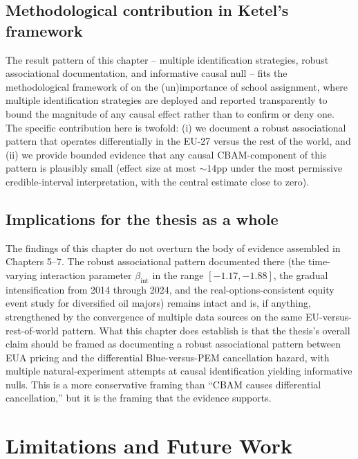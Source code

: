 \documentclass[11pt,a4paper]{article}
\newcommand{\bint}{\beta_{\mathrm{int}}}
\begin{document}
\subsection{Methodological contribution in Ketel's framework}

The result pattern of this chapter -- multiple identification strategies, robust associational documentation, and informative causal null -- fits the methodological framework of \citet{ketel2023unimportance} on the (un)importance of school assignment, where multiple identification strategies are deployed and reported transparently to bound the magnitude of any causal effect rather than to confirm or deny one. The specific contribution here is twofold: (i) we document a robust associational pattern that operates differentially in the EU-27 versus the rest of the world, and (ii) we provide bounded evidence that any causal CBAM-component of this pattern is plausibly small (effect size at most $\sim 14$pp under the most permissive credible-interval interpretation, with the central estimate close to zero).

\subsection{Implications for the thesis as a whole}

The findings of this chapter do not overturn the body of evidence assembled in Chapters 5--7. The robust associational pattern documented there (the time-varying interaction parameter $\bint$ in the range $[-1.17, -1.88]$, the gradual intensification from 2014 through 2024, and the real-options-consistent equity event study for diversified oil majors) remains intact and is, if anything, strengthened by the convergence of multiple data sources on the same EU-versus-rest-of-world pattern. What this chapter does establish is that the thesis's overall claim should be framed as documenting a robust associational pattern between EUA pricing and the differential Blue-versus-PEM cancellation hazard, with multiple natural-experiment attempts at causal identification yielding informative nulls. This is a more conservative framing than ``CBAM causes differential cancellation,'' but it is the framing that the evidence supports.

\section{Limitations and Future Work}
\label{sec:ch8-limitations}
\end{document}

